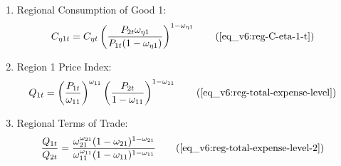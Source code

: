 \documentclass[../thesis.tex]{subfiles}
\begin{document}
{\begin{itemize}
\begin{enumerate}
		\item Regional Consumption of Good 1:	
		\begin{align}
			C_{\eta 1 t} &= C_{\eta t} \left( \frac{P_{2t} \omega_{\eta 1}}{P_{1t} (1 - \omega_{\eta 1})} \right)^{1-\omega_{\eta 1}} \tag{\ref{eq_v6:reg-C-eta-1-t}}
		\end{align}
		
		\item Region 1 Price Index:
		\begin{align}
			Q_{1t} &= \left( \frac{P_{1 t}}{\omega_{11}} \right)^{\omega_{11}} \left( \frac{P_{2 t}}{1 -\omega_{11}} \right)^{1 -\omega_{11}} \tag{\ref{eq_v6:reg-total-expense-level}}
		\end{align}
		
		\item Regional Terms of Trade:
		\begin{align}
			\frac{Q_{1t}}{Q_{2t}} &= \frac{\omega_{21}^{\omega_{21}} (1 -\omega_{21})^{1 -\omega_{21}}}{\omega_{11}^{\omega_{11}} (1 - \omega_{11})^{1 - \omega_{11}}} \tag{\ref{eq_v6:reg-total-expense-level-2}}
		\end{align}

\begin{comment}

		\begin{align}
	C_{\eta t} &= C_{\eta 1 t}^{\omega_{\eta 1}} C_{\eta 2 t}^{1-\omega_{\eta 1}} \tag{\ref{eq_v6:reg-consumption-aggregation}} 
\end{align}


\begin{align}
	C_{11t} &= C_{12t} \frac{\omega_{11} P_{2t}}{(1 - \omega_{11}) P_{1t}} \tag{\ref{eq_v6:reg-C-eta-12-t}}
\end{align}

\item Regional Consumption Weights:
\begin{align}
	\frac{C_{11t} C_{22t}}{C_{21t} C_{12t}} &= \frac{\omega_{11} (1 - \omega_{21})}{\omega_{21} (1 - \omega_{11})} \tag{\ref{eq_v6:reg-C-12-12-t}}
\end{align}


\begin{align}
	Q_{1t} &= \left( \frac{P_{1 t}}{\omega_{11}} \right)^{\omega_{11}} \left( \frac{P_{2 t}}{1 -\omega_{11}} \right)^{1 -\omega_{11}} \tag{\ref{eq_v6:reg-total-expense-level}}	
\end{align}


\begin{align}
	\frac{Q_{1t}}{Q_{2t}} &= \frac{\omega_{21}^{\omega_{21}} (1 -\omega_{21})^{1 -\omega_{21}}}{\omega_{11}^{\omega_{11}} (1 - \omega_{11})^{1 - \omega_{11}}} \tag{\ref{eq_v6:reg-total-expense-level-2}}
\end{align}
	

\end{comment}
\end{enumerate}
\end{itemize}}
\end{document}
